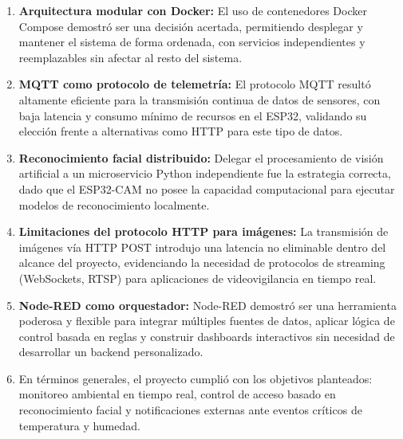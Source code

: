 \documentclass[12pt, a4paper]{report}
\begin{document}
\begin{enumerate}
    \item \textbf{Arquitectura modular con Docker:} El uso de contenedores Docker Compose demostró ser una decisión acertada, permitiendo desplegar y mantener el sistema de forma ordenada, con servicios independientes y reemplazables sin afectar al resto del sistema.

    \item \textbf{MQTT como protocolo de telemetría:} El protocolo MQTT resultó altamente eficiente para la transmisión continua de datos de sensores, con baja latencia y consumo mínimo de recursos en el ESP32, validando su elección frente a alternativas como HTTP para este tipo de datos.

    \item \textbf{Reconocimiento facial distribuido:} Delegar el procesamiento de visión artificial a un microservicio Python independiente fue la estrategia correcta, dado que el ESP32-CAM no posee la capacidad computacional para ejecutar modelos de reconocimiento localmente.

    \item \textbf{Limitaciones del protocolo HTTP para imágenes:} La transmisión de imágenes vía HTTP POST introdujo una latencia no eliminable dentro del alcance del proyecto, evidenciando la necesidad de protocolos de streaming (WebSockets, RTSP) para aplicaciones de videovigilancia en tiempo real.

    \item \textbf{Node-RED como orquestador:} Node-RED demostró ser una herramienta poderosa y flexible para integrar múltiples fuentes de datos, aplicar lógica de control basada en reglas y construir dashboards interactivos sin necesidad de desarrollar un backend personalizado.

    \item En términos generales, el proyecto cumplió con los objetivos planteados: monitoreo ambiental en tiempo real, control de acceso basado en reconocimiento facial y notificaciones externas ante eventos críticos de temperatura y humedad.
\end{enumerate}
\end{document}
